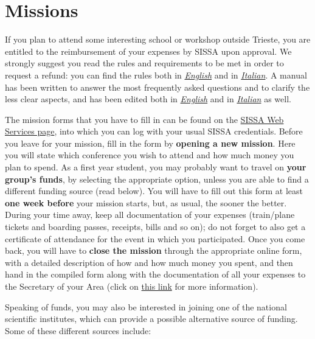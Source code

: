\documentclass{sissavademecum}
\begin{document}
\section{Missions}

If you plan to attend some interesting school or workshop outside Trieste, you are entitled to the reimbursement of your expenses by SISSA upon approval. We strongly suggest you read the rules and requirements to be met in order to request a refund: you can find the rules both in \href{https://services.sissa.it/mission/doc/English/ENGLISH_VERSION_REGOLAMENTO_MISSIONI.pdf}{\emph{English}} and in \href{https://services.sissa.it/mission/doc/Italian/2019_REGOLAMENTO_MISSIONI.pdf}{\emph{Italian}}. A manual has been written to answer the most frequently asked questions and to clarify the less clear aspects, and has been edited both in \href{https://services.sissa.it/mission/doc/English/ENGLISH_VERSION_USERS_GUIDE_C_i__PhD.pdf}{\emph{English}} and in \href{https://services.sissa.it/mission/doc/Italian/MANUALE_C_(i)__PHD.pdf}{\emph{Italian}} as well.

The mission forms that you have to fill in can be found on the \href{https://services.sissa.it/online/}{SISSA Web Services page}, into which you can log with your usual SISSA credentials. Before you leave for your mission, fill in the form by \textbf{opening a new mission}. Here you will state which conference you wish to attend and how much money you plan to spend. As a first year student, you may probably want to travel on \textbf{your group's funds}, by selecting the appropriate option, unless you are able to find a different funding source (read below). You will have to fill out this form at least \textbf{one week before} your mission starts, but, as usual, the sooner the better. During your time away, keep all documentation of your expenses (train/plane tickets and boarding passes, receipts, bills and so on); do not forget to also get a certificate of attendance for the event in which you participated. Once you come back, you will have to \textbf{close the mission} through the appropriate online form, with a detailed description of how and how much money you spent, and then hand in the compiled form along with the documentation of all your expenses to the Secretary of your Area (click on \href{http://wiki.sissa.it/students/index.php/SISSA_staff}{this link} for more information).

Speaking of funds, you may also be interested in joining one of the national scientific institutes, which can provide a possible alternative source of funding. Some of these different sources include:
\end{document}
